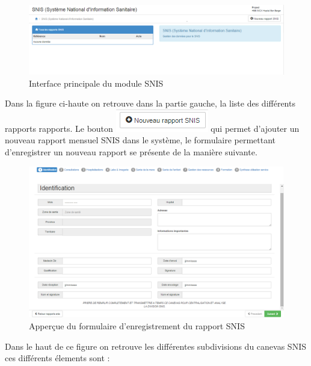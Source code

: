 \documentclass[12pt,a4paper]{report}
\begin{document}
\begin{figure}[h]
\begin{center}
\includegraphics[width=14cm]{pic/snis_main_interface.png}
\end{center}
\caption{Interface principale du module SNIS}
\label{Interface principale du module SNIS}
\end{figure}

Dans la figure ci-haute on retrouve dans la partie gauche, la liste des différents rapports rapports. Le bouton \includegraphics[scale=1]{pic/NewSnis.png} qui permet d'ajouter un nouveau rapport mensuel SNIS dans le système, le formulaire permettant d'enregistrer un nouveau rapport se présente de la manière suivante.

\newpage
\begin{figure}[h]
\begin{center}
\includegraphics[width=14cm]{pic/SnisInterface1.png}
\end{center}
\caption{Apperçue du formulaire d'enregistrement du rapport SNIS}
\label{Apperçue du formulaire d'enregistrement du rapport SNIS}
\end{figure} 

Dans le haut de ce figure on retrouve les différentes subdivisions du canevas SNIS ces différents élements sont :
\end{document}
